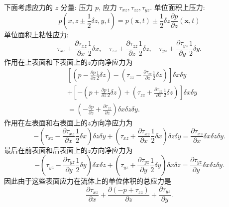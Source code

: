 \documentclass[12pt]{article}
\begin{document}
下面考虑应力的 $z$ 分量: 压力 $p$, 应力 $\tau_{x z}, \tau_{z z}, \tau_{y z} .$  单位面积上压力:
\begin{equation}
	p\left(x , z\pm \frac{1}{2} \delta z, y, t\right)=p(\bm{x}, t) \pm \frac{1}{2} \delta z \frac{\partial p}{\partial z}(\bm{x}, t)
\end{equation}
单位面积上粘性应力:
\begin{equation}
	\tau_{x z} \pm \frac{\partial \tau_{x z}}{\partial x} \frac{1}{2} \delta x, \quad \tau_{z z} \pm \frac{\partial \tau_{z z}}{\partial z} \frac{1}{2} \delta z, \quad \tau_{y z} \pm \frac{\partial \tau_{y z}}{\partial y} \frac{1}{2} \delta y.
\end{equation}
作用在上表面和下表面上的$z$方向净应力为
\begin{align}
&{\left[\left(p-\frac{\partial p}{\partial z} \frac{1}{2} \delta z\right)-\left(\tau_{zz}-\frac{\partial \tau_{zz}}{\partial z} \frac{1}{2} \delta z\right)\right] \delta x \delta y} \\
&+\left[-\left(p+\frac{\partial p}{\partial z} \frac{1}{2} \delta z\right)+\left(\tau_{z z}+\frac{\partial \tau_{z z}}{\partial z} \frac{1}{2} \delta z\right)\right] \delta x \delta y \\
&=\left(-\frac{\partial p}{\partial z}+\frac{\partial \tau_{z z}}{\partial z}\right) \delta x \delta z \delta y.
\end{align}
作用在左表面和右表面上的$z$方向净应力为
\begin{equation}
	-\left(\tau_{xz}-\frac{\partial \tau_{xz}}{\partial x} \frac{1}{2} \delta x\right) \delta z \delta y+\left(\tau_{xz}+\frac{\partial \tau_{xz}}{\partial x} \frac{1}{2} \delta x\right) \delta z \delta y=\frac{\partial \tau_{xz}}{\partial x} \delta x \delta z \delta y.
\end{equation}
最后在前表面和后表面上的$z$方向净应力为
\begin{equation}
	-\left(\tau_{y z}-\frac{\partial \tau_{y z}}{\partial y} \frac{1}{2} \delta y\right) \delta x \delta z+\left(\tau_{y z}+\frac{\partial \tau_{y z}}{\partial y} \frac{1}{2} \delta y\right) \delta x \delta z=\frac{\partial \tau_{y z}}{\partial y} \delta x \delta z \delta y.
\end{equation}
因此由于这些表面应力在流体上的单位体积的总应力是
\begin{equation}
	\frac{\partial\tau_{x z}}{\partial x}+\frac{\partial \left(-p+\tau_{z z}\right)}{\partial z}+\frac{\partial \tau_{y z}}{\partial y}.
\end{equation}
\end{document}
